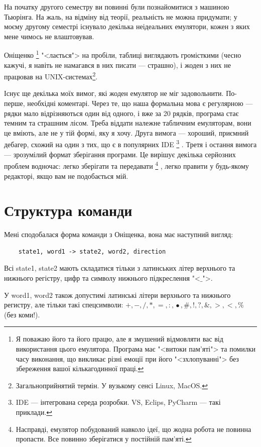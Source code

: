 \documentclass[oneside,final,14pt]{extreport}
\begin{document}
На початку другого семестру ви повинні були познайомитися з машиною Тьюрінга. На жаль, на відміну від теорії, реальність не можна придумати; у моєму другому семестрі існувало декілька неідеальних емулятори, кожен з яких мене чимось не влаштовував. 

Оніщенко
\footnote{Я поважаю його та його працю, але я змушений відмовляти вас від використання цього емулятора. Програма має "<витоки пам'яті"> та помилки часу виконання, що викликає різні емоції при його "<зхлопуванні"> без збереження вашої кількагодинної праці.}
 "<лається"> на пробіли, таблиці виглядають громісткими (чесно кажучі, я навіть не намагався в них писати --- страшно), і жоден з них не працював на UNIX-системах\footnote{Загальноприйнятий термін. У вузькому сенсі Linux, MacOS.}.

Існує ще декілька моїх вимог, які жоден емулятор не міг задовольнити. По-перше, необхідні коментарі. Через те, що наша формальна мова є регулярною  --- рядки мало відрізняються один від одного, і вже за 20 рядків, програма стає темним та страшним лісом. Треба віддати належне табличним емуляторам, вони це вміють, але не у тій формі, яку я хочу.
Друга вимога --- хороший, приємний дебагер, схожий на один з тих, що є в популярних IDE
\footnote{IDE --- інтегрована середа розробки. VS, Eclips, PyCharm --- такі приклади.}
. Третя і остання вимога --- зрозумілий формат зберігання програми. Це вирішує декілька серйозних проблем водночас: легко зберігати та передавати
\footnote{Насправді, емулятор побудований навколо ідеї, що жодна робота не повинна пропасти. Все повинно зберігатися у постійній пам'яті.}
, легко правити у будь-якому редакторі, якщо вам не подобається мій.

\section{Структура команди}

Мені сподобалася форма команди з Оніщенка, вона має наступний вигляд:

\begin{verbatim}
	state1, word1 -> state2, word2, direction
\end{verbatim}

Всі state1, state2 мають складатися тільки з латинських літер верхнього та нижнього регістру, цифр та символу нижнього підкреслення "<$\_$">.
		
У word1, word2 також допустимі латинські літери верхнього та нижнього регистру, але тільки такі спецсимволи: $+,-,/,*,=,:,\hat{•},\#,!,?,\&,>,<,\%$\\ (без коми!). 
		
\end{document}
